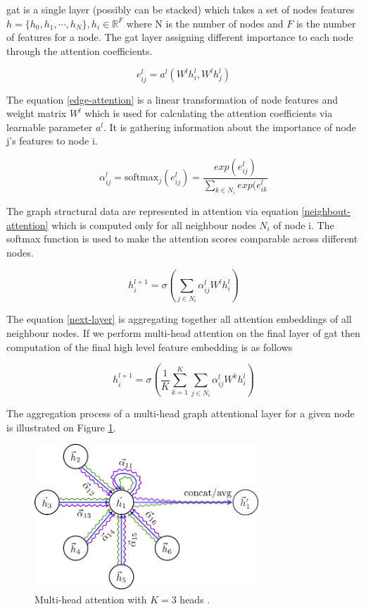         \gls{gat} is a single layer (possibly can be stacked) which takes a set of nodes features $h = \{h_0, h_1, \cdots, h_N\}, h_i \in \mathbb{R}^F$ where N is the number of nodes and $F$ is the number of features for a node. The \gls{gat} layer assigning different importance to each node through the attention coefficients.
        
        \begin{equation}\label{edge-attention}
            e^l_{ij} = a^l(W^l h_i^l, W^l h_j^l)
        \end{equation}
        
        The equation \ref{edge-attention} is a linear transformation of node features and weight matrix $W^l$ which is used for calculating the attention coefficients via learnable parameter $a^l$. It is gathering information about the importance of node j’s features to node i.
        
        \begin{equation}\label{neighbout-attention}
            \alpha_{ij}^l = \text{softmax}_j(e^l_{ij}) = \dfrac{exp(e^l_{ij})}{\sum_{k \in N_i} exp(e^l_{ik}}
        \end{equation}
        
        The graph structural data are represented in attention via equation \ref{neighbout-attention} which is computed only for all neighbour nodes $N_i$ of node i. The softmax function is used to make the attention scores comparable across different nodes. 
        
        \begin{equation}\label{next-layer}
            h_{i}^{l+1} = \sigma(\sum_{j \in N_i} \alpha_{ij}^l W^l h_i^l)
        \end{equation}
        
        The equation \ref{next-layer} is aggregating together all attention embeddings of all neighbour nodes. If we perform multi-head attention on the final layer of \gls{gat} then computation of the final high level feature embedding is as follows
        
        \begin{equation}
            h_{i}^{l+1} = \sigma(\dfrac{1}{K} \sum_{k = 1}^K \sum_{j \in N_i} \alpha_{ij}^l W^k h_i^l)
        \end{equation}
        
        The aggregation process of a multi-head graph attentional layer for a given node is illustrated on Figure \ref{fig:gat-diagram}.
        
        \begin{figure}[ht]
            \centering
            \includegraphics[width=0.75\textwidth]{resources/theoretical-background/gat-diagram.png}
            \caption{Multi-head attention with $K = 3$ heads \cite{gat}.}
            \label{fig:gat-diagram}
        \end{figure}
    
    

